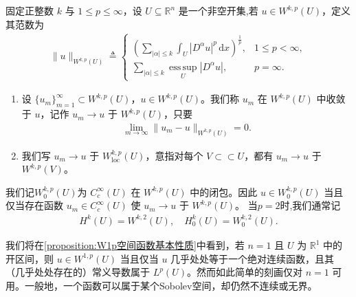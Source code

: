 \documentclass[../../main.tex]{subfiles}
\begin{document}
\begin{definition}\label{definition:ch05-Wkp范数}
固定正整数 $k$ 与 $1\leqslant p\leqslant \infty$，设 $U \subseteq \mathbb{R}^n$ 是一个非空开集,若 $u\in W^{k,p}(U)$，定义其范数为
\begin{align*}
\|u\|_{W^{k,p}(U)}\triangleq
\begin{cases}
\left(\sum_{|\alpha|\leqslant k}\int_{U}|D^{\alpha}u|^{p}\,\mathrm{d}x\right)^{\frac{1}{p}}, & 1\leqslant p<\infty,\\
\sum_{|\alpha|\leqslant k}\operatorname*{ess\,sup}_{U}|D^{\alpha}u|, & p=\infty.
\end{cases}
\end{align*}
\begin{enumerate}[(1)]
\item 设 $\{u_{m}\}_{m=1}^{\infty}\subset W^{k,p}(U)$，$u\in W^{k,p}(U)$。我们称 $u_{m}$ 在 $W^{k,p}(U)$ 中收敛于 $u$，记作 $u_{m}\to u$ 于 $W^{k,p}(U)$，只要
\begin{align*}
\lim_{m\to\infty}\|u_{m}-u\|_{W^{k,p}(U)}=0.
\end{align*}
\item 我们写 $u_{m}\to u$ 于 $W^{k,p}_{\mathrm{loc}}(U)$，意指对每个 $V\subset \subset U$，都有 $u_{m}\to u$ 于 $W^{k,p}(V)$。
\end{enumerate}
我们记$W^{k,p}_{0}(U)$为 $C^{\infty}_{c}(U)$ 在 $W^{k,p}(U)$ 中的闭包。因此 $u\in W^{k,p}_{0}(U)$ 当且仅当存在函数 $u_{m}\in C^{\infty}_{c}(U)$ 使 $u_{m}\to u$ 于 $W^{k,p}(U)$。
当$p=2$时,我们通常记
\begin{align*}
H^{k}(U)=W^{k,2}(U),\quad H^{k}_{0}(U)=W^{k,2}_{0}(U).
\end{align*}
\end{definition}
\begin{remark}
我们将在\cref{proposition:W1p空间函数基本性质}中看到，若 $n=1$ 且 $U$ 为 $\mathbb{R}^{1}$ 中的开区间，则 $u\in W^{1,p}(U)$ 当且仅当 $u$ 几乎处处等于一个绝对连续函数，且其（几乎处处存在的）常义导数属于 $L^{p}(U)$。然而如此简单的刻画仅对 $n=1$ 可用。一般地，一个函数可以属于某个Sobolev空间，却仍然不连续或无界。
\end{remark}
\end{document}
